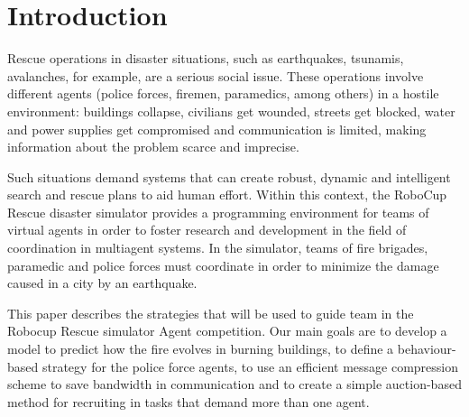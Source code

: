 \section{Introduction}
\label{sec:intro}

Rescue operations in disaster situations, such as earthquakes, tsunamis, avalanches, for example, are a serious social issue. These operations involve different agents (police forces, firemen, paramedics, among others) in a hostile environment: buildings collapse, civilians get wounded, streets get blocked, water and power supplies get compromised and communication is limited, making information about the problem scarce and imprecise.

Such situations demand systems that can create robust, dynamic and intelligent search and rescue plans to aid human effort. Within this context, the RoboCup Rescue disaster simulator \citep{Kitano2000} provides a programming environment for teams of virtual agents in order to foster research and development in the field of coordination in multiagent systems. In the simulator, teams of fire brigades, paramedic and police forces must coordinate in order to minimize the damage caused in a city by an earthquake.

This paper describes the strategies that will be used to guide \teamname team in the Robocup Rescue simulator Agent competition. Our main goals are to develop a model to predict how the fire evolves in burning buildings, to define a behaviour-based strategy for the police force agents, to use an efficient message compression scheme to save bandwidth in communication and to create a simple auction-based method for recruiting in tasks that demand more than one agent.

